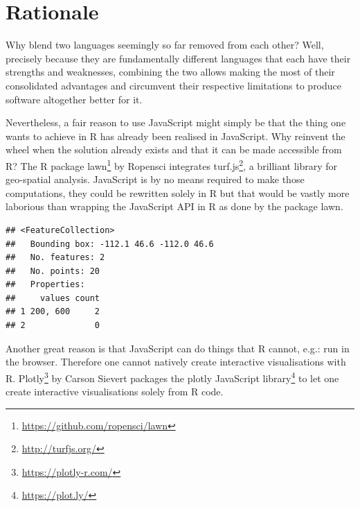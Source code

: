 \documentclass[
]{krantz}
\makeatletter
\newenvironment{Shaded}{\begin{snugshade}}{\end{snugshade}}
\newcommand{\KeywordTok}[1]{\textcolor[rgb]{0.27,0.27,0.27}{\textbf{#1}}}
\newcommand{\NormalTok}[1]{#1}
\newcommand{\OperatorTok}[1]{\textcolor[rgb]{0.43,0.43,0.43}{\textbf{#1}}}
\newcommand{\StringTok}[1]{\textcolor[rgb]{0.5,0.5,0.5}{#1}}
\renewcommand{\href}[2]{#2\footnote{\url{#1}}}
\newenvironment{kframe}{%
\medskip{}
\setlength{\fboxsep}{.8em}
 \def\at@end@of@kframe{}%
 \ifinner\ifhmode%
  \def\at@end@of@kframe{\end{minipage}}%
  \begin{minipage}{\columnwidth}%
 \fi\fi%
 \def\FrameCommand##1{\hskip\@totalleftmargin \hskip-\fboxsep
 \colorbox{shadecolor}{##1}\hskip-\fboxsep
     \hskip-\linewidth \hskip-\@totalleftmargin \hskip\columnwidth}%
 \MakeFramed {\advance\hsize-\width
   \@totalleftmargin\z@ \linewidth\hsize
   \@setminipage}}%
 {\par\unskip\endMakeFramed%
 \at@end@of@kframe}
\renewenvironment{Shaded}{\begin{kframe}}{\end{kframe}}
\makeatother
\begin{document}
\hypertarget{intro-overview-rationale}{%
\section{Rationale}\label{intro-overview-rationale}}

Why blend two languages seemingly so far removed from each other? Well, precisely because they are fundamentally different languages that each have their strengths and weaknesses, combining the two allows making the most of their consolidated advantages and circumvent their respective limitations to produce software altogether better for it.

Nevertheless, a fair reason to use JavaScript might simply be that the thing one wants to achieve in R has already been realised in JavaScript. Why reinvent the wheel when the solution already exists and that it can be made accessible from R? The R package \href{https://github.com/ropensci/lawn}{lawn} \citep{R-lawn} by Ropensci integrates \href{http://turfjs.org/}{turf.js}, a brilliant library for geo-spatial analysis. JavaScript is by no means required to make those computations, they could be rewritten solely in R but that would be vastly more laborious than wrapping the JavaScript API in R as done by the package lawn.

\begin{Shaded}
\end{Shaded}

\begin{verbatim}
## <FeatureCollection>
##   Bounding box: -112.1 46.6 -112.0 46.6
##   No. features: 2
##   No. points: 20
##   Properties: 
##     values count
## 1 200, 600     2
## 2              0
\end{verbatim}

Another great reason is that JavaScript can do things that R cannot, e.g.: run in the browser. Therefore one cannot natively create interactive visualisations with R. \href{https://plotly-r.com/}{Plotly} \citep{R-plotly} by Carson Sievert packages the \href{https://plot.ly/}{plotly JavaScript library} to let one create interactive visualisations solely from R code.
\end{document}

